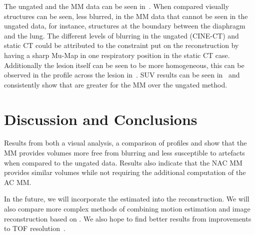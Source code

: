      The ungated and the \gls{MM} data can be seen in~. When compared visually structures can be seen, less blurred, in the \gls{MM} data that cannot be seen in the ungated data, for instance, structures at the boundary between the diaphragm and the lung. The different levels of blurring in the ungated (CINE-\gls{CT}) and static \gls{CT} could be attributed to the constraint put on the reconstruction by having a sharp \gls{Mu-Map} in one respiratory position in the static \gls{CT} case. Additionally the lesion itself can be seen to be more homogeneous, this can be observed in the profile across the lesion in~. \gls{SUV} results can be seen in~ and consistently show that  are greater for the \gls{MM} over the ungated method.


\section{Discussion and Conclusions} \label{sec:discussion_and_conclusions}
    Results from both a visual analysis, a comparison of profiles and  show that the \gls{MM} provides volumes more free from blurring and less susceptible to artefacts when compared to the ungated data. Results also indicate that the \gls{NAC} \gls{MM} provides similar volumes while not requiring the additional computation of the \gls{AC} \gls{MM}.
    
    In the future, we will incorporate the estimated  into the reconstruction. We will also compare more complex methods of combining motion estimation and image reconstruction based on \cite{Bousse2016b}. We also hope to find better results from improvements to \gls{TOF} resolution~\cite{Efthimiou2020UseScanners, Efthimiou2020TOF-PETBGO}.
    